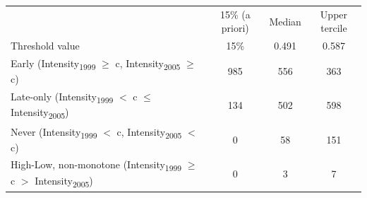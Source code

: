 \begin{tabular}{lccc} \hline \hline
& 15\% (a priori) & Median & Upper tercile \\ 
Threshold value & 15\% & 0.491 & 0.587 \\ \toprule
Early (Intensity{\textsubscript{1999}} $\geq$ c, Intensity{\textsubscript{2005}} $\geq$ c) & 985 & 556 & 363 \\ 
Late-only (Intensity{\textsubscript{1999}} $<$ c $\leq$ Intensity{\textsubscript{2005}}) & 134 & 502 & 598 \\ 
Never (Intensity{\textsubscript{1999}} $<$ c, Intensity{\textsubscript{2005}} $<$ c) & 0 & 58 & 151 \\ 
High-Low, non-monotone (Intensity{\textsubscript{1999}} $\geq$ c $>$ Intensity{\textsubscript{2005}}) & 0 & 3 & 7 \\ 
\bottomrule
\end{tabular}
